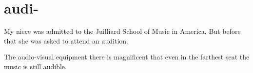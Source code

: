 \chapter{audi-}

\begin{vocabulary}[audio]
\end{vocabulary}

\begin{vocabulary}[audience]
\end{vocabulary}

\begin{vocabulary}[audition] 
    My  niece  was admitted  to  the Juilliard School of Music  in  America. But before that she was asked to attend an audition.
\end{vocabulary}

\begin{vocabulary}[auditorium]
\end{vocabulary}

\begin{vocabulary}
    The audio-visual equipment there  is  magnificent that even  in the  farthest seat the music is still audible.
\end{vocabulary}

